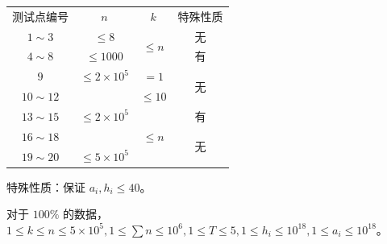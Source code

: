 \documentclass[12pt,a4paper,oneside]{ctexart}
\begin{document}
{\def\LTcaptype{none} %
\begin{longtable}[]{c|c|c|c}
\hhline{-|-|-|-}
测试点编号 & \(n\) & \(k\) & 特殊性质 \\
\hhline{-|-|-|-}
\endhead
\hhline{-|-|-|-}
\endlastfoot
\(1 \sim 3\) & \(\le 8\) & \multirow{2}{*}{\(\le n\)} & 无 \\ \hhline{-|-|~|-}
\(4 \sim 8\) & \(\le 1000\) &  & 有 \\ \hhline{-|-|-|-}
\(9\) & \(\le 2 \times 10^5\) & \(=1\) & \multirow{2}{*}{无} \\ \hhline{-|-|-|~}
\(10 \sim 12\) & \multirow{3}{*}{\(\le 2 \times 10^5\)} & \(\le 10\) &  \\ \hhline{-|~|-|~}
\(13 \sim 15\) &  & \multirow{3}{*}{\(\le n\)} & 有 \\ \hhline{-|~|~|-}
\(16 \sim 18\) &  &  & \multirow{2}{*}{无} \\ \hhline{-|-|~|~}
\(19 \sim 20\) & \(\le 5 \times 10^5\) &  &  \\
\end{longtable}
}

特殊性质：保证 \(a_i,h_i \le 40\)。

对于 \(100\%\) 的数据，\(1 \le k \le n \le 5 \times 10^5,1 \le \sum n \le 10^6,1 \le T \le 5,1 \le h_i \le 10^{18},1 \le a_i \le 10^{18}\)。
\end{document}
